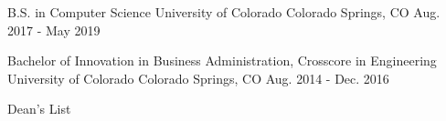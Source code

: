 

\begin{cventries}

  \cventry
    {B.S. in Computer Science} %
    {University of Colorado} %
    {Colorado Springs, CO} %
    {Aug. 2017 - May 2019} %
    {
      \begin{cvitems} %
      \end{cvitems}
    }


  \cventry
    {Bachelor of Innovation in Business Administration, Crosscore in Engineering} %
    {University of Colorado} %
    {Colorado Springs, CO} %
    {Aug. 2014 - Dec. 2016} %
    {
      \begin{cvitems} %
        {Dean's List}
      \end{cvitems}
    }
\end{cventries}
